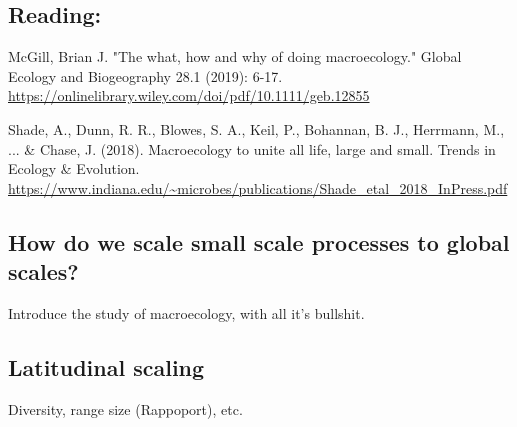 \documentclass[12pt]{article}
\begin{document}
\subsection*{Reading:}

McGill, Brian J. "The what, how and why of doing macroecology." Global Ecology and Biogeography 28.1 (2019): 6-17. \\ \url{https://onlinelibrary.wiley.com/doi/pdf/10.1111/geb.12855} \\

\bigskip

Shade, A., Dunn, R. R., Blowes, S. A., Keil, P., Bohannan, B. J., Herrmann, M., ... \& Chase, J. (2018). Macroecology to unite all life, large and small. Trends in Ecology \& Evolution. \\ \url{https://www.indiana.edu/~microbes/publications/Shade_etal_2018_InPress.pdf} \\











\begin{center}
\noindent\hrulefill 
\end{center}



\clearpage



\subsection*{How do we scale small scale processes to global scales?}

Introduce the study of macroecology, with all it's bullshit. 

















\bigskip
\subsection*{Latitudinal scaling}


Diversity, range size (Rappoport), etc. 
\end{document}
